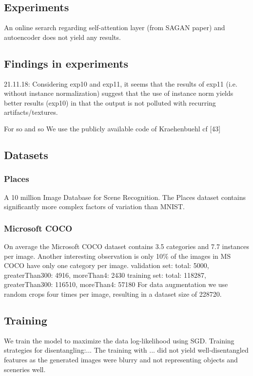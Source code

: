 \documentclass[10pt,letterpaper]{article}
\begin{document}
\subsection{Experiments}
An online serarch regarding self-attention layer (from SAGAN paper) and autoencoder does not yield any results.

\subsection{Findings in experiments}
21.11.18: Considering exp10 and exp11, it seems that the results of exp11 (i.e. without instance normalization) suggest that the use of instance norm yields better results (exp10) in that the output is not polluted with recurring artifacts/textures.

\par For so and so We use the publicly available code of Kraehenbuehl cf [43]

\subsection{Datasets}
\subsubsection{Places}
A 10 million Image Database for Scene Recognition. The Places dataset contains significantly more complex factors of variation than MNIST.

\subsubsection{Microsoft COCO}
On average the Microsoft COCO dataset \cite{1405.0312} contains 3.5 categories and 7.7 instances per image. Another interesting observation is only 10\% of the images in MS COCO have only one category per image.
validation set: total: 5000, greaterThan300: 4916, moreThan4: 2430
training set: total: 118287, greaterThan300: 116510, moreThan4: 57180
For data augmentation we use random crops four times per image, resulting in a dataset size of 228720.

\subsection{Training}
We train the model to maximize the data log-likelihood using SGD.
Training strategies for disentangling:...
The training with ... did not yield well-disentangled features as the generated images were blurry and not representing objects and sceneries well. 
\end{document}
